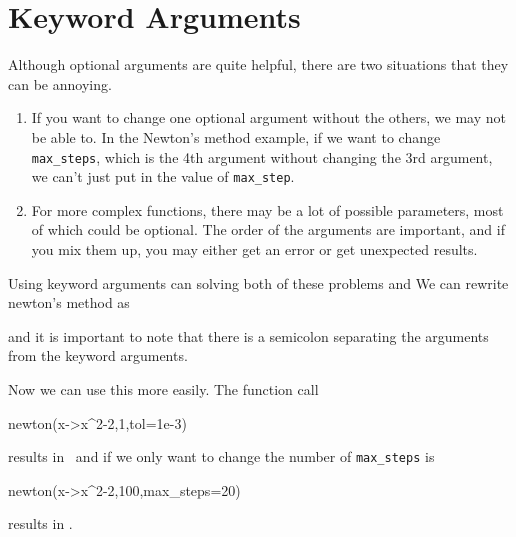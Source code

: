 \section{Keyword Arguments}

Although optional arguments are quite helpful, there are two situations that they can be annoying. 
\begin{enumerate}
\item If you want to change one optional argument without the others, we may not be able to.  In the Newton's method example, if we want to change \verb!max_steps!, which is the 4th argument without changing the 3rd argument, we can't just put in the value of \verb!max_step!. 
\item For more complex functions, there may be a lot of possible parameters, most of which could be optional.  The order of the arguments are important, and if you mix them up, you may either get an error or get unexpected results.  
\end{enumerate}

Using keyword arguments can solving both of these problems and 
We can rewrite newton's method as 
and it is important to note that there is a semicolon separating the arguments from the keyword arguments.  

Now we can use this more easily.  The function call
\begin{jlblock}[adf]
newton(x->x^2-2,1,tol=1e-3)
\end{jlblock}
results in \printpythontex[verb] ~and if we only want to change the number of \verb!max_steps! is
\begin{jlblock}[adf]
newton(x->x^2-2,100,max_steps=20)
\end{jlblock}
results in \printpythontex[verb].

